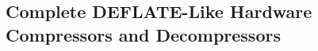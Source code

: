 \documentclass[doublespace,draft,nopageskip]{VTthesis} %
\begin{document}
\subsection{Complete DEFLATE-Like Hardware Compressors and Decompressors}\label{ss:complete_deflate-like_hardware_compressors_and_decompressors}





\end{document}
